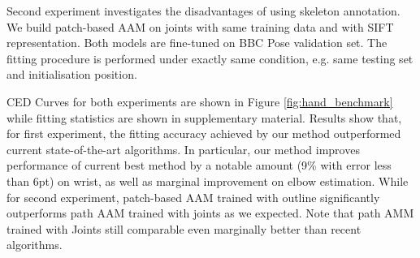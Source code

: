 Second experiment investigates the disadvantages of using skeleton annotation. We build patch-based AAM on joints with same training data and with SIFT representation. Both models are fine-tuned on BBC Pose validation set. The fitting procedure is performed under exactly same condition, e.g. same testing set and initialisation position.

CED Curves for both experiments are shown in Figure \ref{fig:hand_benchmark} while fitting statistics are shown in supplementary material. Results show that, for first experiment, the fitting accuracy achieved by our method outperformed current state-of-the-art algorithms. In particular, our method improves performance of current best method \cite{pfister2015flowing} by a notable amount (9\% with error less than 6pt) on wrist, as well as marginal improvement on elbow estimation. While for second experiment, patch-based AAM trained with outline significantly outperforms path AAM trained with joints as we expected. Note that path AMM trained with Joints still comparable even marginally better than recent algorithms.





